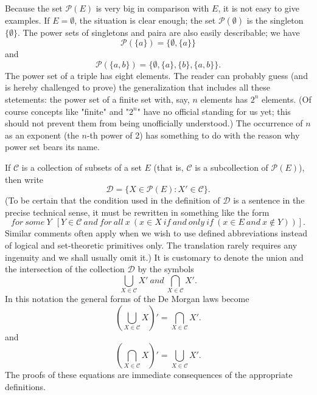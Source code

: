 Because the set $ \mathcal{P} (E) $ is very big in comparison with $E$, it is not easy to give examples. If $E = \emptyset $, the situation is clear enough; the set $ \mathcal{P} ( \emptyset ) $ is the singleton $\{ \emptyset \}$. The power sets of singletons and paira are also easily describable; we have 
\begin{equation*}
\mathcal{P} ( \{ a \} ) = \{ \emptyset, \{ a \} \} 
\end{equation*}
and 
\begin{equation*}
\mathcal{P} ( \{ a, b \} ) = \{ \emptyset, \{ a \} , \{ b \} , \{ a,b \} \} .
\end{equation*}
The power set of a triple has eight elements. The reader can probably guess (and is hereby challenged to prove) the generalization that includes all these stetements: the power set of a finite set with, say, $n$ elements has $2^{n}$ elements. (Of course concepts like "finite" and "$2^{n}$" have no official standing for us yet; this should not prevent them from being unofficially understood.) The occurrence of $n$ as an exponent (the $n$-th power of 2) has something to do with the reason why power set bears its name. 

If $ \mathcal{C} $ is a collection of subsets of a set $E$ (that is, $ \mathcal{C} $ is a subcollection of $ \mathcal{P} (E) $), then write
\begin{equation*}
\mathcal{D} = \{ X \in \mathcal{P} (E): X' \in \mathcal{C} \} .
\end{equation*}
(To be certain that the condition used in the definition of $ \mathcal{D} $ is a sentence in the precise technical sense, it must be rewritten in something like the form 
\begin{equation*}
for \: some \: Y \:\ [ Y \in \mathcal{C} \: and \: for \: all \: x\ ( x \in X \: if \: and \: only \: if \: (x \in E \: and \: x \notin Y)) ] .  
\end{equation*}
Similar comments often apply when we wish to use defined abbreviations instead of logical and set-theoretic primitives only. The translation rarely requires any ingenuity and we shall usually omit it.) It is customary to denote the union and the intersection of the collection $ \mathcal{D} $ by the symbols  
\begin{equation*}
\bigcup_{X \in \mathcal{C}} X' \: and \: \bigcap_{X \in \mathcal{C}} X' .
\end{equation*}
In this notation the general forms of the De Morgan laws become 
\begin{equation*}
( \bigcup_{X \in \mathcal{C}} X)' = \bigcap_{X \in \mathcal{C}} X' .
\end{equation*}
and 
\begin{equation*}
( \bigcap_{X \in \mathcal{C}} X)' = \bigcup_{X \in \mathcal{C}} X' .
\end{equation*}
The proofs of these equations are immediate consequences of the appropriate definitions. 


